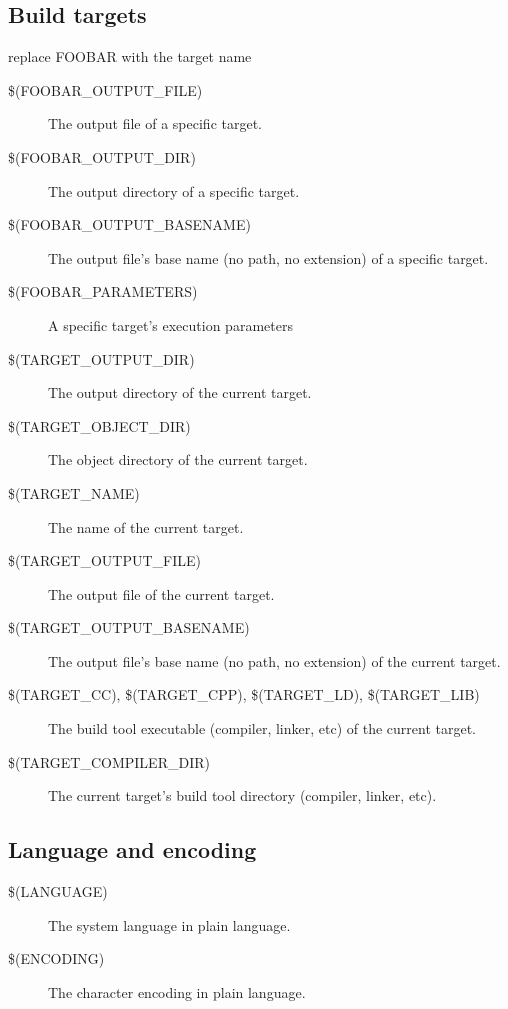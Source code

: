 \subsection{Build targets}

replace FOOBAR with the target name 

\begin{description}
\item[{\footnotesize \$(FOOBAR\_OUTPUT\_FILE)}] The output file of a specific target.
\item[{\footnotesize \$(FOOBAR\_OUTPUT\_DIR)}] The output directory of a specific target.
\item[{\footnotesize \$(FOOBAR\_OUTPUT\_BASENAME)}] The output file's base name (no path, no extension) of a specific target.
\item[{\footnotesize \$(FOOBAR\_PARAMETERS)}] A specific target's execution parameters
\item[{\footnotesize \$(TARGET\_OUTPUT\_DIR)}] The output directory of the current target.
\item[{\footnotesize \$(TARGET\_OBJECT\_DIR)}] The object directory of the current target.
\item[{\footnotesize \$(TARGET\_NAME)}] The name of the current target.
\item[{\footnotesize \$(TARGET\_OUTPUT\_FILE)}] The output file of the current target.
\item[{\footnotesize \$(TARGET\_OUTPUT\_BASENAME)}] The output file's base name (no path, no extension) of the current target.
\item[{\footnotesize \$(TARGET\_CC), \$(TARGET\_CPP), \$(TARGET\_LD), \$(TARGET\_LIB)}] The build tool executable (compiler, linker, etc) of the current target.
\item[{\footnotesize \$(TARGET\_COMPILER\_DIR)}] The current target's build tool directory (compiler, linker, etc).
\end{description}

\subsection{Language and encoding}

\begin{description}
\item[{\footnotesize \$(LANGUAGE)}] The system language in plain language.
\item[{\footnotesize \$(ENCODING)}] The character encoding in plain language.
\end{description}

